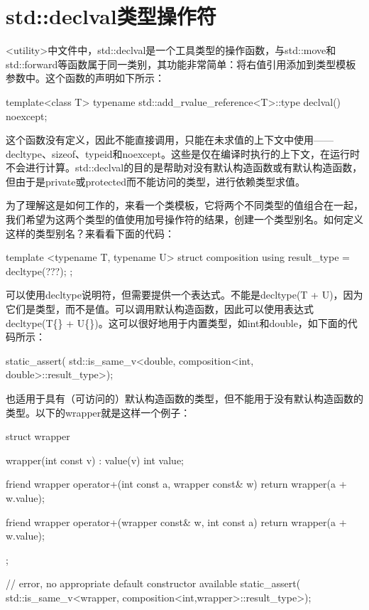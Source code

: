 \section{std::declval类型操作符}
<utility>中文件中，std::declval是一个工具类型的操作函数，与std::move和std::forward等函数属于同一类别，其功能非常简单：将右值引用添加到类型模板参数中。这个函数的声明如下所示：

\begin{cpp}
template<class T>
typename std::add_rvalue_reference<T>::type declval() noexcept;
\end{cpp}

这个函数没有定义，因此不能直接调用，只能在未求值的上下文中使用——decltype、sizeof、typeid和noexcept。这些是仅在编译时执行的上下文，在运行时不会进行计算。std::declval的目的是帮助对没有默认构造函数或有默认构造函数，但由于是private或protected而不能访问的类型，进行依赖类型求值。

为了理解这是如何工作的，来看一个类模板，它将两个不同类型的值组合在一起，我们希望为这两个类型的值使用加号操作符的结果，创建一个类型别名。如何定义这样的类型别名？来看看下面的代码：

\begin{cpp}
template <typename T, typename U>
struct composition
{
	using result_type = decltype(???);
};
\end{cpp}

可以使用decltype说明符，但需要提供一个表达式。不能是decltype(T + U)，因为它们是类型，而不是值。可以调用默认构造函数，因此可以使用表达式decltype(T\{\} + U\{\})。这可以很好地用于内置类型，如int和double，如下面的代码所示：

\begin{cpp}
static_assert(
	std::is_same_v<double,
		composition<int, double>::result_type>);
\end{cpp}

也适用于具有（可访问的）默认构造函数的类型，但不能用于没有默认构造函数的类型。以下的wrapper就是这样一个例子：

\begin{cpp}
struct wrapper
{
	wrapper(int const v) : value(v){}
	int value;
	
	friend wrapper operator+(int const a, wrapper const& w)
	{
		return wrapper(a + w.value);
	}

	friend wrapper operator+(wrapper const& w, int const a)
	{
		return wrapper(a + w.value);
	}
};

// error, no appropriate default constructor available
static_assert(
	std::is_same_v<wrapper,
		composition<int,wrapper>::result_type>);
\end{cpp}

